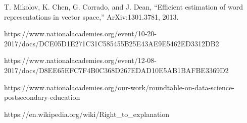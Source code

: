 \documentclass[11pt]{article}
\begin{document}
\begin{thebibliography}{10}
\begin{small}
T. Mikolov, K. Chen, G. Corrado, and J. Dean,
``Efficient estimation of word representations in vector space,''
ArXiv:1301.3781, 2013.

https://www.nationalacademies.org/event/10-20-2017/docs/DCE05D1E271C31C585455B25E43AE9E5462ED3312DB2

https://www.nationalacademies.org/event/12-08-2017/docs/D8EE65EFC7F4B0C368D267EDAD10E5AB1BAFBE3369D2

https://www.nationalacademies.org/our-work/roundtable-on-data-science-postsecondary-education

https://en.wikipedia.org/wiki/Right\_to\_explanation


\end{small}
\end{thebibliography}
\end{document}
